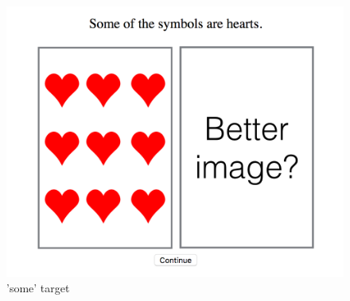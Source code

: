 \documentclass[]{article}
\begin{document}
\begin{figure}[h]
\begin{minipage}[b]{0.3\textwidth}
\includegraphics[width=\textwidth]{some_test.png} 
\caption{'some' target }
\end{minipage}
\end{figure}
\end{document}
